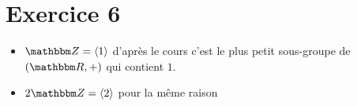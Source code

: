 \part{Exercice 6}

\begin{itemize}
	\item 
		$\Z = \left<1\right>$ d'après le cours c'est le plus petit sous-groupe de $(\R, +)$ qui contient $1$.
	\item
		$2\Z = \langle 2 \rangle$ pour la même raison
\end{itemize}
